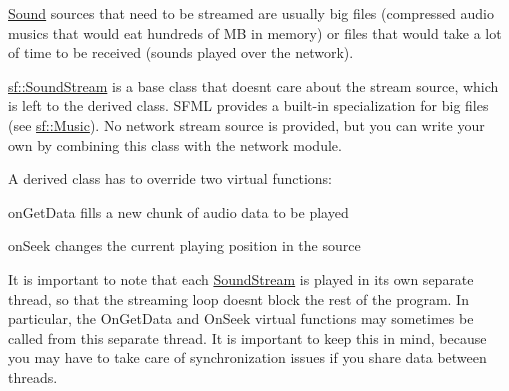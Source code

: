 \hyperlink{classsf_1_1_sound}{Sound} sources that need to be streamed are usually big files (compressed audio musics that would eat hundreds of MB in memory) or files that would take a lot of time to be received (sounds played over the network).

\hyperlink{classsf_1_1_sound_stream}{sf\+::\+Sound\+Stream} is a base class that doesn\textquotesingle{}t care about the stream source, which is left to the derived class. S\+F\+ML provides a built-\/in specialization for big files (see \hyperlink{classsf_1_1_music}{sf\+::\+Music}). No network stream source is provided, but you can write your own by combining this class with the network module.

A derived class has to override two virtual functions\+: \begin{DoxyItemize}
\item on\+Get\+Data fills a new chunk of audio data to be played \item on\+Seek changes the current playing position in the source\end{DoxyItemize}
It is important to note that each \hyperlink{classsf_1_1_sound_stream}{Sound\+Stream} is played in its own separate thread, so that the streaming loop doesn\textquotesingle{}t block the rest of the program. In particular, the On\+Get\+Data and On\+Seek virtual functions may sometimes be called from this separate thread. It is important to keep this in mind, because you may have to take care of synchronization issues if you share data between threads.

